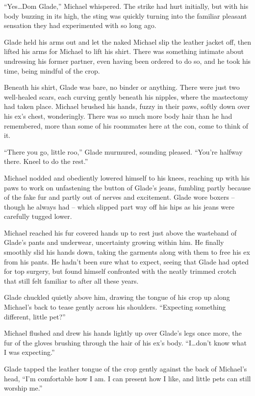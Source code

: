``Yes\ldots{}Dom Glade,'' Michael whispered.  The strike had hurt initially, but with his body buzzing in its high, the sting was quickly turning into the familiar pleasant sensation they had experimented with so long ago.

Glade held his arms out and let the naked Michael slip the leather jacket off, then lifted his arms for Michael to lift his shirt.  There was something intimate about undressing his former partner, even having been ordered to do so, and he took his time, being mindful of the crop.

Beneath his shirt, Glade was bare, no binder or anything.  There were just two well-healed scars, each curving gently beneath his nipples, where the mastectomy had taken place.  Michael brushed his hands, fuzzy in their paws, softly down over his ex's chest, wonderingly.  There was so much more body hair than he had remembered, more than some of his roommates here at the con, come to think of it.

``There you go, little roo,'' Glade murmured, sounding pleased.  ``You're halfway there.  Kneel to do the rest.''

Michael nodded and obediently lowered himself to his knees, reaching up with his paws to work on unfastening the button of Glade's jeans, fumbling partly because of the fake fur and partly out of nerves and excitement.  Glade wore boxers -- though he always had -- which slipped part way off his hips as his jeans were carefully tugged lower.

Michael reached his fur covered hands up to rest just above the wasteband of Glade's pants and underwear, uncertainty growing within him.  He finally smoothly slid his hands down, taking the garments along with them to free his ex from his pants.  He hadn't been sure what to expect, seeing that Glade had opted for top surgery, but found himself confronted with the neatly trimmed crotch that still felt familiar to after all these years.

Glade chuckled quietly above him, drawing the tongue of his crop up along Michael's back to tease gently across his shoulders.  ``Expecting something different, little pet?''

Michael flushed and drew his hands lightly up over Glade's legs once more, the fur of the gloves brushing through the hair of his ex's body.  ``I\ldots{}don't know what I was expecting.''

Glade tapped the leather tongue of the crop gently against the back of Michael's head, ``I'm comfortable how I am.  I can present how I like, and little pets can still worship me.''


